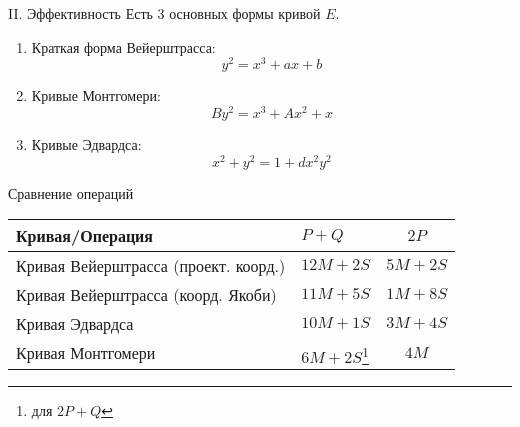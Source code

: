 \documentclass{beamer}
\begin{document}

\begin{frame}{II. Эффективность}
Есть $3$ основных формы кривой $E$.
\begin{enumerate}
    \item Краткая форма Вейерштрасса:
    \[y^2 = x^3 + a x + b\]
    \item Кривые Монтгомери:
    \[
    B y^2 = x^3 + A x^2 + x
    \]
    \item Кривые Эдвардса:
    \[
    x^2 + y^2 = 1 + d x^2 y^2
    \]
\end{enumerate}
\end{frame}

\begin{frame}{Сравнение операций}
\begin{table}[]
    \begin{tabular}{l|lc}
     Кривая/Операция   & $P + Q$ & $2 P$  \\
        \hline
     Кривая Вейерштрасса (проект. коорд.)  & $12 M + 2 S$ & $5M + 2 S$ \\
     Кривая Вейерштрасса (коорд. Якоби)  & $11 M + 5 S$ & $1M + 8 S$ \\
     Кривая Эдвардса  & $10 M + 1 S$  & $3M + 4 S$ \\
     Кривая Монтгомери & $6M + 2 S$\footnote{ для $2P + Q$} & $4M$
    \end{tabular}
\end{table}

\end{frame}


\end{document}
